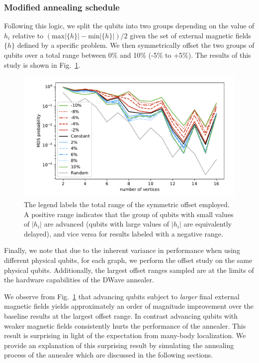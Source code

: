 \documentclass[prd,twocolumn,tightenlines,preprintnumbers,showpacs,superscriptaddress,notitlepage,nofootinbib,eqsecnum,floatfix,longbibliography]{revtex4}
\begin{document}
\subsubsection{Modified annealing schedule}

Following this logic, we split the qubits into two groups depending on the value of $h_i$ relative to $(\textrm{max}|\{h\}| - \textrm{min}|\{h\}|) / 2$ given the set of external magnetic fields $\{h\}$ defined by a specific problem.
We then symmetrically offset the two groups of qubits over a total range between 0\% and 10\% (-5\% to +5\%).
The results of this study is shown in Fig.~\ref{fig:dwave_offset}.

\begin{figure}[b]
    \centering
    \includegraphics[width=\columnwidth]{./figures/scaling_comparison_all.pdf}
    \caption{The legend labels the total range of the symmetric offset employed.
A positive range indicates that the group of qubits with small values of $|h_i|$ are advanced (qubits with large values of $|h_i|$ are equivalently delayed), and vice versa for results labeled with a negative range.}
    \label{fig:dwave_offset}
\end{figure}

Finally, we note that due to the inherent variance in performance when using different physical qubits, for each graph, we perform the offset study on the same physical qubits.
Additionally, the largest offset ranges sampled are at the limits of the hardware capabilities of the DWave annealer.

We observe from Fig.~\ref{fig:dwave_offset} that advancing qubits subject to \textit{larger} final external magnetic fields yields approximately an order of magnitude improvement over the baseline results at the largest offset range.
In contrast advancing qubits with weaker magnetic fields consistently hurts the performance of the annealer.
This result is surprising in light of the expectation from many-body localization.
We provide an explanation of this surprising result by simulating the annealing process of the annealer which are discussed in the following sections.
\end{document}
